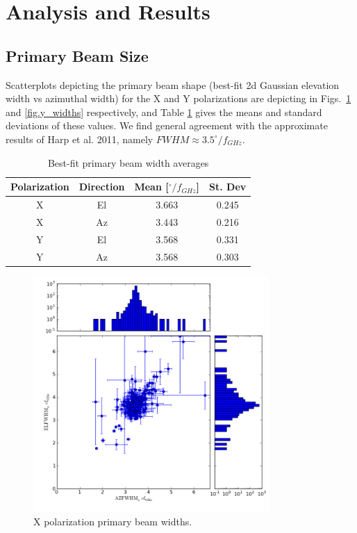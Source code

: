 \documentclass[preprint]{aastex}
\begin{document}
\section{Analysis and Results}\label{s.results}

\subsection{Primary Beam Size}\label{ss.beamsize}
Scatterplots depicting the primary beam shape (best-fit 2d Gaussian
elevation width vs azimuthal width) for the X and Y polarizations are
depicting in Figs.~\ref{fig.x_widths} and \ref{fig.y_widths}
respectively, and Table \ref{tab.widths} gives the means and standard
deviations of these values.  We find general agreement with the
approximate results of Harp et al. 2011\cite{Harp2011}, namely $FWHM
\approx 3.5^{\circ} / f_{GHz}$.

\begin{table}[!h]
\begin{center}
\begin{tabular}{|c|c|c|c|} \hline
Polarization & Direction & Mean [$^{\circ} / f_{GHz}$] & St. Dev \\
\hline
\hline
X & El & 3.663 & 0.245\\
\hline
X & Az & 3.443 & 0.216 \\
\hline
Y & El & 3.568 & 0.331 \\
\hline
Y & Az & 3.568 & 0.303\\
\hline
\end{tabular}
\caption{Best-fit primary beam width averages \label{tab.widths}}
\end{center}
\end{table}

\begin{figure}[h!]
\begin{center}
\includegraphics[width=0.8\textwidth]{images/x_widths.png}
\caption{X polarization primary beam widths. \label{fig.x_widths}}
\end{center}
\end{figure}
\end{document}
